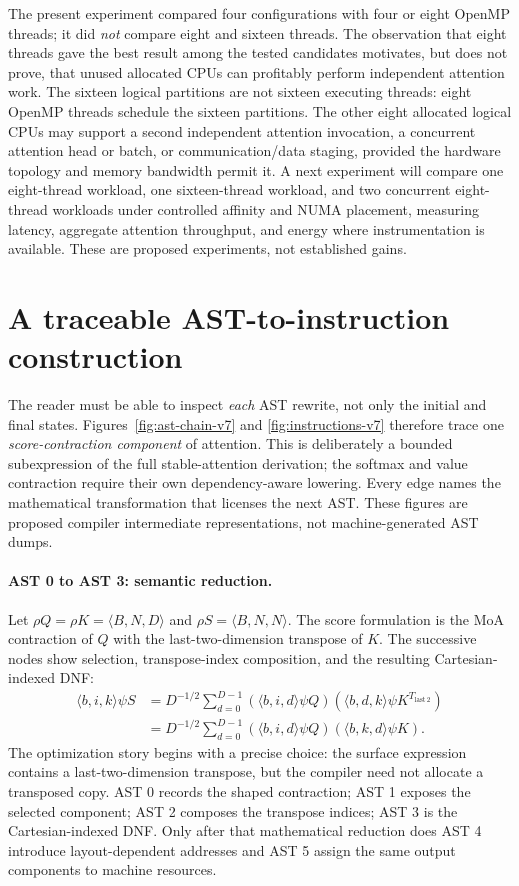\documentclass[11pt]{article}
\begin{document}
The present experiment compared four configurations with four or eight OpenMP threads; it did \emph{not} compare eight and sixteen threads. The observation that eight threads gave the best result among the tested candidates motivates, but does not prove, that unused allocated CPUs can profitably perform independent attention work. The sixteen logical partitions are not sixteen executing threads: eight OpenMP threads schedule the sixteen partitions. The other eight allocated logical CPUs may support a second independent attention invocation, a concurrent attention head or batch, or communication/data staging, provided the hardware topology and memory bandwidth permit it. A next experiment will compare one eight-thread workload, one sixteen-thread workload, and two concurrent eight-thread workloads under controlled affinity and NUMA placement, measuring latency, aggregate attention throughput, and energy where instrumentation is available. These are proposed experiments, not established gains.

\section{A traceable AST-to-instruction construction}
The reader must be able to inspect \emph{each} AST rewrite, not only the initial and final states. Figures~\ref{fig:ast-chain-v7} and \ref{fig:instructions-v7} therefore trace one \emph{score-contraction component} of attention. This is deliberately a bounded subexpression of the full stable-attention derivation; the softmax and value contraction require their own dependency-aware lowering. Every edge names the mathematical transformation that licenses the next AST. These figures are proposed compiler intermediate representations, not machine-generated AST dumps.

\paragraph{AST 0 to AST 3: semantic reduction.}
Let $\rho Q=\rho K=\langle B,N,D\rangle$ and $\rho S=\langle B,N,N\rangle$. The score formulation is the MoA contraction of $Q$ with the last-two-dimension transpose of $K$. The successive nodes show selection, transpose-index composition, and the resulting Cartesian-indexed DNF:
\begin{equation}
\begin{aligned}
\langle b,i,k\rangle\psi S
 &=D^{-1/2}\sum_{d=0}^{D-1}
 (\langle b,i,d\rangle\psi Q)
 (\langle b,d,k\rangle\psi K^{T_{\mathrm{last}\,2}})\\
 &=D^{-1/2}\sum_{d=0}^{D-1}
 (\langle b,i,d\rangle\psi Q)
 (\langle b,k,d\rangle\psi K).
\end{aligned}
\end{equation}
The optimization story begins with a precise choice: the surface expression contains a last-two-dimension transpose, but the compiler need not allocate a transposed copy. AST 0 records the shaped contraction; AST 1 exposes the selected component; AST 2 composes the transpose indices; AST 3 is the Cartesian-indexed DNF. Only after that mathematical reduction does AST 4 introduce layout-dependent addresses and AST 5 assign the same output components to machine resources.
\end{document}
